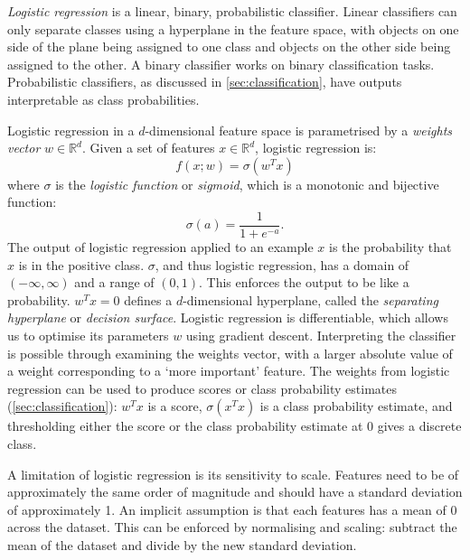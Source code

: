 \documentclass[11pt, a4paper]{book}
\newcommand{\defn}[1]{\emph{#1}}
\begin{document}
        \defn{Logistic regression} is a linear, binary, probabilistic classifier. Linear classifiers can only separate classes using a hyperplane in the feature space, with objects on one side of the plane being assigned to one class and objects on the other side being assigned to the other. A binary classifier works on binary classification tasks. Probabilistic classifiers, as discussed in \autoref{sec:classification}, have outputs interpretable as class probabilities.

        Logistic regression in a $d$-dimensional feature space is parametrised by a \defn{weights vector} $w \in \mathbb R^d$. Given a set of features $x \in \mathbb R^d$, logistic regression is:
        \begin{equation}
            \label{eq:logistic-regression}
            f(x; w) = \sigma(w^T x)
        \end{equation}
        where $\sigma$ is the \defn{logistic function} or \defn{sigmoid}, which is a monotonic and bijective function:
        \begin{equation}
            \label{eq:logistic-function}
            \sigma(a) = \frac{1}{1 + e^{-a}}.
        \end{equation}
        The output of logistic regression applied to an example $x$ is the probability that $x$ is in the positive class. $\sigma$, and thus logistic regression, has a domain of $(-\infty, \infty)$ and a range of $(0, 1)$. This enforces the output to be like a probability. $w^T x= 0$ defines a $d$-dimensional hyperplane, called the \defn{separating hyperplane} or \defn{decision surface}. Logistic regression is differentiable, which allows us to optimise its parameters $w$ using gradient descent. Interpreting the classifier is possible through examining the weights vector, with a larger absolute value of a weight corresponding to a `more important' feature. The weights from logistic regression can be used to produce scores or class probability estimates (\autoref{sec:classification}): $w^T x$ is a score, $\sigma(x^T x)$ is a class probability estimate, and thresholding either the score or the class probability estimate at $0$ gives a discrete class.

        A limitation of logistic regression is its sensitivity to scale. Features need to be of approximately the same order of magnitude and should have a standard deviation of approximately 1. An implicit assumption is that each features has a mean of 0 across the dataset. This can be enforced by normalising and scaling: subtract the mean of the dataset and divide by the new standard deviation.
\end{document}
